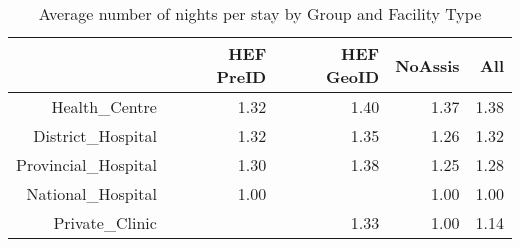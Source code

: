 \begin{table}[ht]
\centering
\begin{tabular}{rrrrr}
  \hline
 & HEF PreID & HEF GeoID & NoAssis & All \\ 
  \hline
Health\_Centre & 1.32 & 1.40 & 1.37 & 1.38 \\ 
  District\_Hospital & 1.32 & 1.35 & 1.26 & 1.32 \\ 
  Provincial\_Hospital & 1.30 & 1.38 & 1.25 & 1.28 \\ 
  National\_Hospital & 1.00 &  & 1.00 & 1.00 \\ 
  Private\_Clinic &  & 1.33 & 1.00 & 1.14 \\ 
   \hline
\end{tabular}
\caption{Average number of nights per stay by Group and Facility Type} 
\end{table}
